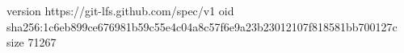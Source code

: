 version https://git-lfs.github.com/spec/v1
oid sha256:1c6eb899ce676981b59c55e4c04a8c57f6e9a23b23012107f818581bb700127c
size 71267
